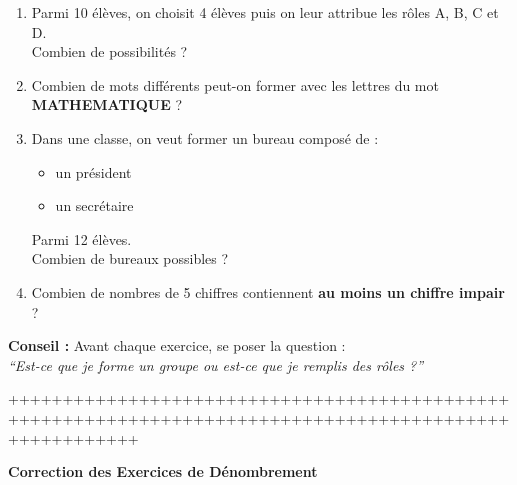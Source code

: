 \documentclass[12pt]{article}
\begin{document}
\begin{enumerate}[label=\textbf{Exercice \arabic*.}]
\vspace{0.3cm}

\item Parmi 10 élèves, on choisit 4 élèves puis on leur attribue les rôles A, B, C et D.\\
Combien de possibilités ?

\vspace{0.3cm}

\item Combien de mots différents peut-on former avec les lettres du mot \textbf{MATHEMATIQUE} ?

\vspace{0.3cm}

\item Dans une classe, on veut former un bureau composé de :
\begin{itemize}
    \item un président
    \item un secrétaire
\end{itemize}
Parmi 12 élèves.\\
Combien de bureaux possibles ?

\vspace{0.3cm}

\item Combien de nombres de 5 chiffres contiennent \textbf{au moins un chiffre impair} ?

\end{enumerate}

\vspace{0.5cm}

\textbf{Conseil :} Avant chaque exercice, se poser la question :\\
\textit{“Est-ce que je forme un groupe ou est-ce que je remplis des rôles ?”}

++++++++++++++++++++++++++++++++++++++++++++++++++++++++++++++++++++++++++++++++++++++++++++++++++++++++

\begin{center}
    \Large \textbf{Correction des Exercices de Dénombrement}
\end{center}

\vspace{0.5cm}
\end{document}
